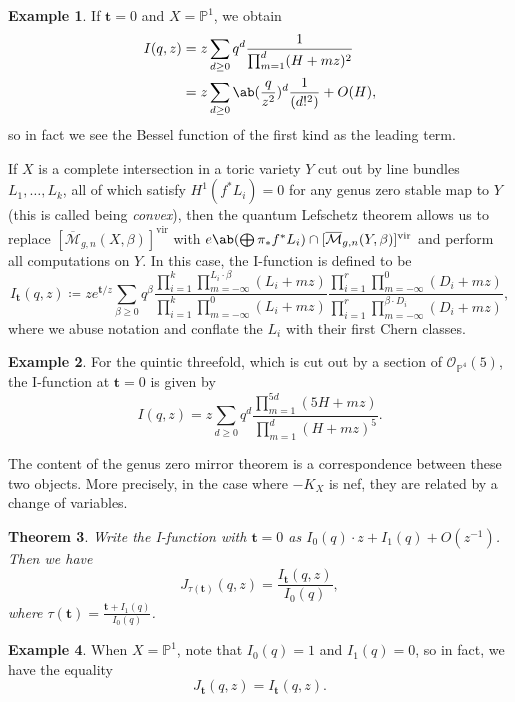 \documentclass{amsart}
\newtheorem{thm}{Theorem}[section]
\theoremstyle{definition}
\newtheorem{exm}[thm]{Example}
\theoremstyle{remark}
\theoremstyle{plain}
\theoremstyle{definition}
\theoremstyle{remark}
\renewcommand{\P}{\mathbb{P}}
\newcommand{\Mbar}{\overline{\mathcal{M}}}
\newcommand{\mc}[1]{\mathcal{#1}}
\newcommand{\mbf}[1]{\mathbf{#1}}
\newcommand{\mr}[1]{\mathrm{#1}}
\newcommand{\1}{\mathbf{1}}
\newcommand{\2}{\mathbf{2}}
\newcommand{\3}{\mathbf{3}}
\newcommand{\vir}{\mr{vir}}
\begin{document}
\begin{exm}
    If \(\mbf{t} = 0\) and \(X = \P^1\), we obtain
    \begin{align*}
        I(q,z) &= z\sum_{d \geq 0} q^d \frac{1}{\prod_{m=1}^d (H + mz)^2} \\
        &= z\sum_{d \geq 0} \ab(\frac{q}{z^2})^d \frac{1}{(d!^2)} + O(H),
    \end{align*}
    so in fact we see the Bessel function of the first kind as the leading term.
\end{exm}

If \(X\) is a complete intersection in a toric variety \(Y\) cut out by line bundles \(L_1, \ldots, L_k\), all of which satisfy \(H^1(f^* L_i) = 0\) for any genus zero stable map to \(Y\) (this is called being \textit{convex}), then the quantum Lefschetz theorem allows us to replace \([\Mbar_{g,n}(X, \beta)]^{\vir}\) with \(e\ab(\bigoplus \pi_* f^* L_i) \cap [\Mbar_{g,n}(Y, \beta)]^{\vir}\) and perform all computations on \(Y\). In this case, the I-function is defined to be
\[
    I_{\mbf{t}}(q,z) \coloneqq z e^{\mbf{t}/z} \sum_{\beta \geq 0} q^{\beta} \frac{\prod_{i=1}^k \prod_{m=-\infty}^{L_i \cdot \beta} (L_i + mz)}{\prod_{i=1}^k \prod_{m=-\infty}^{0} (L_i + mz)} \frac{\prod_{i=1}^r \prod_{m = -\infty}^{0} (D_i + mz)}{\prod_{i=1}^r \prod_{m=-\infty}^{\beta \cdot D_i} (D_i + mz)},
\]
where we abuse notation and conflate the \(L_i\) with their first Chern classes.

\begin{exm}
    For the quintic threefold, which is cut out by a section of \(\mc{O}_{\P^4}(5)\), the I-function at \(\mbf{t} = 0\) is given by
    \[ I(q,z) = z \sum_{d \geq 0} q^d \frac{\prod_{m=1}^{5d}(5H+mz)}{\prod_{m=1}^d (H+mz)^5}. \]
\end{exm}

The content of the genus zero mirror theorem is a correspondence between these two objects. More precisely, in the case where \(-K_X\) is nef, they are related by a change of variables.

\begin{thm}
    Write the I-function with \(\mbf{t} = 0\) as \(I_0(q) \cdot z + I_1(q) + O(z^{-1})\). Then we have 
    \[
        J_{\tau(\mbf{t})}(q,z) = \frac{I_{\mbf{t}}(q,z)}{I_0(q)},
    \]
    where \(\tau(\mbf{t}) = \frac{\mbf{t} + I_1(q)}{I_0(q)}\). 
\end{thm}

\begin{exm}
    When \(X = \P^1\), note that \(I_0(q) = 1\) and \(I_1(q) = 0\), so in fact, we have the equality
    \[ J_{\mbf{t}}(q,z) = I_{\mbf{t}}(q,z). \]
\end{exm}
\end{document}
